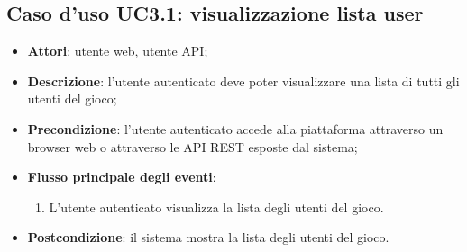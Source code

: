 \subsection{Caso d'uso UC3.1: visualizzazione lista user}
\begin{itemize}
\item \textbf{Attori}: utente web, utente API;
\item \textbf{Descrizione}: l'utente autenticato deve poter visualizzare una lista di tutti gli utenti del gioco; 
      \item \textbf{Precondizione}: l'utente autenticato accede alla piattaforma attraverso un browser web o attraverso le API REST esposte dal sistema;

        \item \textbf{Flusso principale degli eventi}:
          \begin{enumerate}
          \item L'utente autenticato visualizza la lista degli utenti del gioco.

      \end{enumerate}
    \item \textbf{Postcondizione}: il sistema mostra la lista degli utenti del gioco.
  \end{itemize}
\hypertarget{UC3.2}{}
